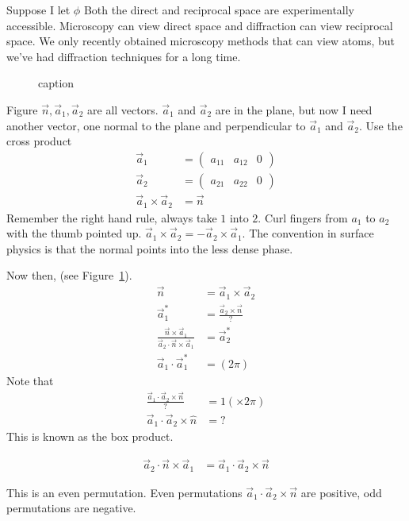 \documentclass{article}
\newcommand{\nvec}[0]{\vec{n}}
\newcommand{\aone}[0]{\vec{a}_1}
\newcommand{\atwo}[0]{\vec{a}_2}
\begin{document}
\begin{section}{Suppose I let $\phi$}
	Both the direct and reciprocal space are experimentally accessible. Microscopy can view direct space and diffraction can view reciprocal space. We only recently obtained microscopy methods that can view atoms, but we've had diffraction techniques for a long time.
	\begin{figure}[h]
		\centering
		\caption{caption}
		\label{fig:vectorRound}
	\end{figure}
Figure
$\vec{n},\aone,\atwo$ are all vectors. $\aone$ and $\atwo$ are in the plane, but now I need another vector, one normal to the plane and perpendicular to $\aone$ and $\atwo$. Use the cross product
\begin{align*}
	\aone &= \begin{pmatrix}a_{11} & a_{12} & 0\end{pmatrix}\\
	\atwo &= \begin{pmatrix}a_{21} & a_{22} & 0\end{pmatrix}\\
	\aone\times\atwo &= \vec{n}
\end{align*}
Remember the right hand rule, always take $1$ into $2$. Curl fingers from $a_1$ to $a_2$ with the thumb pointed up. $\aone\times\atwo = -\atwo\times\aone$. The convention in surface physics is that the normal points into the less dense phase.

Now then, (see Figure~\ref{fig:vectorRound}).
\begin{align*}
	\nvec &= \aone\times\atwo\\
	\aone^\ast &= \frac{\atwo\times\nvec}{?}\\
	\frac{\nvec\times\aone}{\atwo\cdot\nvec\times\aone} &= \atwo^\ast\\
	\aone \cdot\aone^\ast &= (2\pi)
\end{align*}
Note that 
\begin{align*}
	\frac{\aone\cdot\atwo\times\nvec}{?} &= 1 (\times 2\pi)\\
	\aone\cdot\atwo\times\hat{n} &= ?
\end{align*}
This is known as the box product.

\begin{align*}
	\atwo\cdot\nvec\times\aone &= \aone\cdot\atwo\times\nvec
\end{align*}

This is an even permutation. Even permutations $\aone\cdot\atwo\times\nvec$ are positive, odd permutations are negative.


\end{section}
\end{document}
